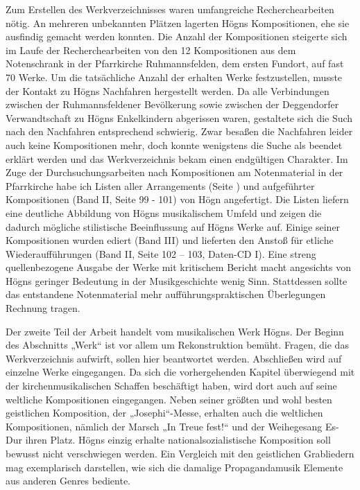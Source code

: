 \documentclass[a4paper]{article}
\newcounter{Abb}
\begin{document}
Zum Erstellen des Werkverzeichnisses waren umfangreiche
Recherchearbeiten nötig. An mehreren unbekannten Plätzen lagerten Högns
Kompositionen, ehe sie ausfindig gemacht werden konnten. Die Anzahl der
Kompositionen steigerte sich im Laufe der Recherchearbeiten von den 12
Kompositionen aus dem Notenschrank in der Pfarrkirche Ruhmannsfelden,
dem ersten Fundort, auf fast 70 Werke. Um die tatsächliche Anzahl der
erhalten Werke festzustellen, musste der Kontakt zu Högns Nachfahren
hergestellt werden. Da alle Verbindungen zwischen der Ruhmannsfeldener
Bevölkerung sowie zwischen der Deggendorfer Verwandtschaft zu Högns
Enkelkindern abgerissen waren, gestaltete sich die Such nach den
Nachfahren entsprechend schwierig. Zwar besaßen die Nachfahren leider
auch keine Kompositionen mehr, doch konnte wenigstens die Suche als
beendet erklärt werden und das Werkverzeichnis bekam einen endgültigen
Charakter. Im Zuge der Durchsuchungsarbeiten nach Kompositionen am
Notenmaterial in der Pfarrkirche habe ich Listen aller Arrangements
(Seite \pageref{bkm:Ref100328080}) und aufgeführter Kompositionen (Band
II, Seite 99 - 101) von Högn angefertigt. Die Listen liefern eine
deutliche Abbildung von Högns musikalischem Umfeld und zeigen die
dadurch mögliche stilistische Beeinflussung auf Högns Werke auf. Einige
seiner Kompositionen wurden ediert (Band III) und lieferten den Anstoß
für etliche Wiederaufführungen (Band II, Seite 102 – 103, Daten-CD I).
Eine streng quellenbezogene Ausgabe der Werke mit kritischem Bericht
macht angesichts von Högns geringer Bedeutung in der Musikgeschichte
wenig Sinn. Stattdessen sollte das entstandene Notenmaterial mehr
aufführungspraktischen Überlegungen Rechnung tragen.

Der zweite Teil der Arbeit handelt vom musikalischen Werk Högns. Der
Beginn des Abschnitts „Werk“ ist vor allem um Rekonstruktion bemüht.
Fragen, die das Werkverzeichnis aufwirft, sollen hier beantwortet
werden. Abschließen wird auf einzelne Werke eingegangen. Da sich die
vorhergehenden Kapitel überwiegend mit der kirchenmusikalischen
Schaffen beschäftigt haben, wird dort auch auf seine weltliche
Kompositionen eingegangen. Neben seiner größten und wohl besten
geistlichen Komposition, der „Josephi“-Messe, erhalten auch die
weltlichen Kompositionen, nämlich der Marsch „In Treue fest!“ und der
Weihegesang Es-Dur ihren Platz. Högns einzig erhalte
nationalsozialistische Komposition soll bewusst nicht verschwiegen
werden. Ein Vergleich mit den geistlichen Grabliedern mag exemplarisch
darstellen, wie sich die damalige Propagandamusik Elemente aus anderen
Genres bediente.
\end{document}
